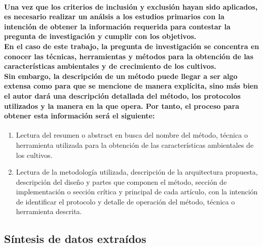 \documentclass[10pt, twocolumn]{article}
\begin{document}
\paragraph{Una vez que los criterios de inclusión y exclusión hayan sido aplicados, es necesario realizar un análsis a los estudios primarios con la intención de obtener la información requerida para contestar la pregunta de investigación y cumplir con los objetivos. \\ En el caso de este trabajo, la pregunta de investigación se concentra en conocer las técnicas, herramientas y métodos para la obtención de las características ambientales y de crecimiento de los cultivos. \\ Sin embargo, la descripción de un método puede llegar a ser algo extensa como para que se mencione de manera explícita, sino más bien el autor dará una descripción detallada del método, los protocolos utilizados y la manera en la que opera. Por tanto, el proceso para obtener esta información será el siguiente:}
\begin{enumerate}
	\item{Lectura del resumen o abstract en busca del nombre del método, técnica o herramienta utilizada para la obtención de las características ambientales de los cultivos.}
	\item{Lectura de la metodología utilizada, descripción de la arquitectura propuesta, descripción del diseño y partes que componen el método, sección de implementación o sección crítica y principal de cada artículo, con la intención de identificar el protocolo y detalle de operación del método, técnica o herramienta descrita.}
\end{enumerate}

\subsection{Síntesis de datos extraídos}
\end{document}
